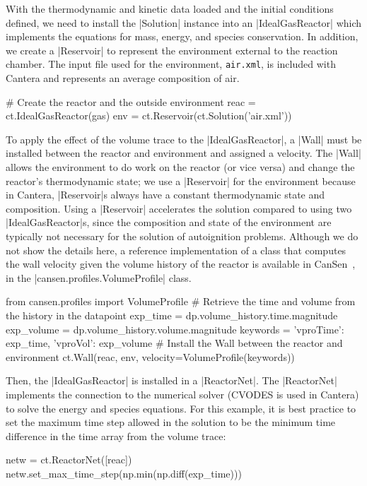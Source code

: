 \documentclass[12pt]{ijck}
\begin{document}
With the thermodynamic and kinetic data loaded and the initial conditions defined, we  need to
install the \pybox|Solution| instance into an \pybox|IdealGasReactor| which implements the equations
for mass, energy, and species conservation. In addition, we create a \pybox|Reservoir| to represent
the environment external to the reaction chamber. The input file used for the environment,
\verb|air.xml|, is included with Cantera and represents an average composition of air.
%
\begin{pythonbox}
# Create the reactor and the outside environment
reac = ct.IdealGasReactor(gas)
env = ct.Reservoir(ct.Solution('air.xml'))
\end{pythonbox}
%
To apply the effect of the volume trace to the \pybox|IdealGasReactor|, a \pybox|Wall| must be
installed between the reactor and environment and assigned a velocity. The \pybox|Wall| allows the
environment to do work on the reactor (or vice versa) and change the reactor's thermodynamic state;
we use a \pybox|Reservoir| for the environment because in Cantera, \pybox|Reservoir|s always have a
constant thermodynamic state and composition. Using a \pybox|Reservoir| accelerates the solution
compared to using two \pybox|IdealGasReactor|s, since the composition and state of the environment
are typically not necessary for the solution of autoignition problems. Although we do not show the
details here, a reference implementation of a class that computes the wall velocity given the volume
history of the reactor is available in CanSen~\autocite{cansen}, in the
\pybox|cansen.profiles.VolumeProfile| class.
%
\begin{pythonbox}
from cansen.profiles import VolumeProfile
# Retrieve the time and volume from the history in the datapoint
exp_time = dp.volume_history.time.magnitude
exp_volume = dp.volume_history.volume.magnitude
keywords = {'vproTime': exp_time, 'vproVol': exp_volume}
# Install the Wall between the reactor and environment
ct.Wall(reac, env, velocity=VolumeProfile(keywords))
\end{pythonbox}

Then, the \pybox|IdealGasReactor| is installed in a \pybox|ReactorNet|. The \pybox|ReactorNet|
implements the connection to the numerical solver (CVODES \autocite{hindmarsh_sundials:_2005} is
used in Cantera) to solve the energy and species equations. For this example, it is best practice
to set the maximum time step allowed in the solution to be the minimum time difference in
the time array from the volume trace:
%
\begin{pythonbox}
netw = ct.ReactorNet([reac])
netw.set_max_time_step(np.min(np.diff(exp_time)))
\end{pythonbox}
\end{document}
